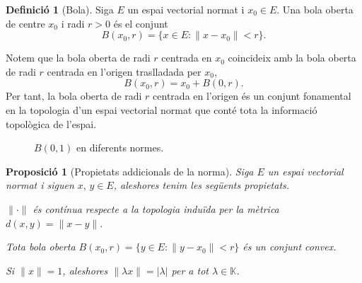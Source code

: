 \documentclass[12pt]{book}
\newtheorem{prop}[teorema]{Proposició}
\theoremstyle{definition}
\newtheorem{defi}[teorema]{Definició}
\theoremstyle{nota}
\theoremstyle{exemple}
\begin{document}
\begin{defi}[Bola]
  Siga $E$ un espai vectorial normat i $x_0 \in E$. Una bola oberta de
  centre $x_0$ i radi $r > 0$ és el conjunt
  \[
    B(x_0, r) = \{ x \in E : \|x - x_0\| < r \}.
  \]
\end{defi}

Notem que la bola oberta de radi $r$ centrada en $x_0$ coincideix amb
la bola oberta de radi $r$ centrada en l'origen traslladada per $x_0$,
\[
  B(x_0, r) = x_0 + B(0,r).
\]
Per tant, la bola oberta de radi $r$ centrada en l'origen és un
conjunt fonamental en la topologia d'un espai vectorial normat que
conté tota la informació topològica de l'espai.

\begin{figure}[htbp]
  \centering
  \hspace{1cm}
  \hspace{1cm}
  \caption{$B(0,1)$ en diferents normes.}
  \label{fig:bola-normes}
\end{figure}

\begin{prop}[Propietats addicionals de la norma]
  Siga $E$ un espai vectorial normat i siguen $x, \, y \in E$,
  aleshores tenim les següents propietats.
  \begin{description}[noitemsep]
  \item[Continuïtat] $\|\cdot\|$ és contínua respecte a la topologia
    induïda per la mètrica $d(x,y) = \|x - y\|$.
  \item[Convexitat de boles] Tota bola oberta
    $B(x_0, r) = \{y \in E : \|y - x_0\| < r\}$ és un conjunt convex.
  \item[Escalabilitat] Si $\|x\| = 1$, aleshores
    $\|\lambda x\| = |\lambda|$ per a tot $\lambda \in \mathbb{K}$.
  \end{description}
\end{prop}
\end{document}
